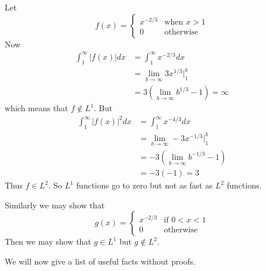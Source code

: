 \begin{ex}
Let
\begin{equation}
f(x) = \begin{cases}x^{-2/3}&\text{when }x>1\\
0&\text{otherwise}\end{cases}
\end{equation}
Now
\begin{subequations}
\begin{align}
\int^{\infty}_{1}|f(x)|dx &= \int^{\infty}_{1}x^{-2/3}dx\\
&= \lim_{b\to\infty}3x^{1/3}|^{b}_{1}\\
&= 3(\lim_{b\to\infty}b^{1/3}-1)=\infty
\end{align}
\end{subequations}
which means that $f\notin L^{1}$. But
\begin{subequations}
\begin{align}
\int^{\infty}_{1}|f(x)|^{2}dx &=
\int^{\infty}_{1}x^{-4/3}dx\\
&= \lim_{b\to\infty}-3x^{-1/3}|^{b}_{1}\\
&= -3(\lim_{b\to\infty}b^{-1/3}-1)\\
&= -3(-1) = 3
\end{align}
\end{subequations}
Thus $f\in L^2$. So $L^1$ functions go to zero but not as
fast as $L^2$ functions.
\end{ex}

Similarly we may show that
\begin{equation}
g(x) = \begin{cases} x^{-2/3} &\text{if }0< x<1\\
0 &\text{otherwise}\end{cases}
\end{equation}
Then we may show that $g\in L^1$ but $g\notin L^2$.

We will now give a list of useful facts without proofs.

